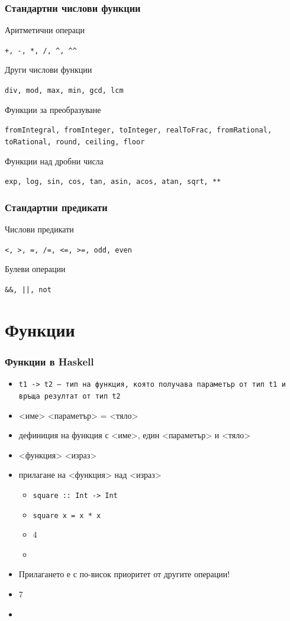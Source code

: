 \documentclass{beamer}
\begin{document}
\begin{frame}
  \frametitle{Стандартни числови функции}

  Аритметични операци

  \tt{+}, \tt{-}, \tt{*}, \tt{/}, \tt{\^{}}, \tt{\^{}\^{}}

  \vspace{1em}
  Други числови функции

  \tt{div}, \tt{mod}, \tt{max}, \tt{min}, \tt{gcd}, \tt{lcm}

  \vspace{1em}
  Функции за преобразуване

  \tt{fromIntegral}, \tt{fromInteger}, \tt{toInteger}, \tt{realToFrac}, \tt{fromRational}, \tt{toRational}, \tt{round}, \tt{ceiling}, \tt{floor}

  \vspace{1em}
  Функции над дробни числа

  \tt{exp}, \tt{log}, \tt{sin}, \tt{cos}, \tt{tan}, \tt{asin}, \tt{acos}, \tt{atan}, \tt{sqrt}, \tt{**}
\end{frame}

\begin{frame}
  \frametitle{Стандартни предикати}

  Числови предикати

  \tt{<}, \tt{>}, \tt{=}, \tt{/=}, \tt{<=}, \tt{>=}, \tt{odd}, \tt{even}

  \vspace{1em}
  Булеви операции

  \tt{\&\&}, \tt{||}, \tt{not}
\end{frame}

\section{Функции}

\begin{frame}
  \frametitle{Функции в Haskell}
  \begin{itemize}[<+->]
  \item \tt{t1 -> t2} --- тип на функция, която получава параметър от тип \tt{t1} и връща резултат от тип \tt{t2}
  \item {}<име> <параметър> \tta= <тяло>
  \item дефиниция на функция с <име>, един <параметър> и <тяло>
  \item {}<функция> <израз>
  \item прилагане на <функция> над <израз>
    \begin{itemize}[<.->]
    \item \tt{square :: Int -> Int}
    \item \tt{square x = x * x}
    \item {}4
    \item {}
    \end{itemize}
  \item \alert{Прилагането е с по-висок приоритет от другите операции!}
  \item {}7
  \item {}
  \end{itemize}
\end{frame}
\end{document}
